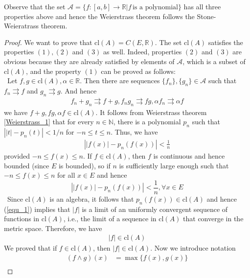 \documentclass[12pt,leqno]{amsart}
\theoremstyle{definition}
\numberwithin{equation}{subsection}
\begin{document}
Observe that the set $\mathcal{A} = \{f:[a,b]\to\mathbb{R} | f\, \text{is a polynomial}\}$ has all three properties above and hence the Weierstrass theorem follows the Stone-Weieratrass theorem. 
\begin{proof}
We want to prove that $\text{cl}(A) = C(E,\mathbb{R})$. The set $\text{cl}(A)$ satisfies the properties $(1),(2)$ and $(3)$ as well. Indeed, properties $(2)$ and $(3)$ are obvious because they are already satisfied by elements of $\mathcal{A}$, which is a subset of $\text{cl}(A)$, and the property $(1)$ can be proved as follows: \\
\hspace*{1em}\, Let $f,g\in \text{cl}(A), \alpha\in\mathbb{R}$. Then there are sequences $\{f_n\},\{g_n\}\in\mathcal{A}$ such that $f_n\rightrightarrows f$ and $g_n\rightrightarrows g$. And hence 
\begin{align*}
    f_n+g_n \rightrightarrows f+g,
    f_n g_n \rightrightarrows fg,
    \alpha f_n \rightrightarrows \alpha f
\end{align*}
we have $f+g,fg,\alpha f\in\text{cl}(A)$. It follows from Weierstrass theorem \ref{Weierstrass_1} that for every $n\in\mathbb{N}$, there is a polynomial $p_n$ such that $\left||t| - p_n(t)\right| < 1/n$ for $-n\leq t \leq n$. Thus, we have
\begin{align*}
    \left||f(x)| - p_n(f(x))\right| < \frac{1}{n}
\end{align*}
provided $-n \leq f(x) \leq n$. If $f\in\text{cl}(A)$, then $f$ is continuous and hence bounded (since $E$ is bounded), so if $n$ is sufficiently large enough such that $-n \leq f(x) \leq n$ for all $x\in E$ and hence 
\begin{equation}
    \label{equ_1}
    \left||f(x)| - p_n(f(x))\right| < \frac{1}{n}, \forall x\in E
\end{equation}
\hspace*{1em}\, Since $\text{cl}(A)$  is an algebra, it follows that $p_n(f(x))\in\text{cl}(A)$ and hence (\ref{equ_1}) implies that $|f|$ is a limit of an uniformly convergent sequence of functions in $\text{cl}(A)$, i.e., the limit of a sequence in $\text{cl}(A)$ that converge in the metric space. Therefore, we have
\begin{align*}
    |f| \in \text{cl}(A)
\end{align*}
We proved that if $f\in\text{cl}(A)$, then $|f|\in\text{cl}(A)$. Now we introduce notation 
\begin{align*}
    (f \wedge g)(x) & = \max\{f(x),g(x)\}\\

\end{align*}
\end{proof}
\end{document}
